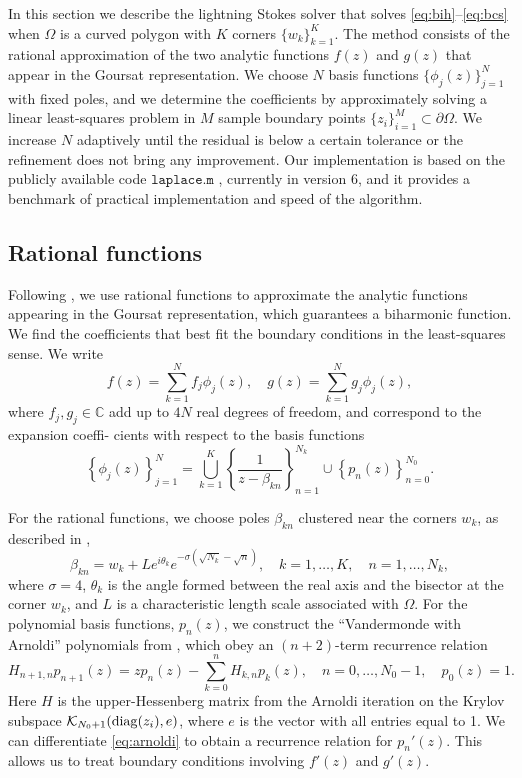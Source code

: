 \documentclass{article}
\begin{document}
In this section we describe the lightning Stokes solver that solves
\eqref{eq:bih}--\eqref{eq:bcs} when $\Omega$ is a curved polygon with $K$
corners $\{w_k\}_{k=1}^K$. The method consists of the rational approximation of
the two analytic functions $f(z)$ and $g(z)$ that appear in the Goursat
representation. We choose $N$ basis functions $\{\phi_j(z)\}_{j=1}^N$ with
fixed poles, and we determine the coefficients by approximately solving a
linear least-squares problem in $M$ sample boundary points $\{z_i\}_{i=1}^M
\subset \partial\Omega$. We increase $N$ adaptively until the residual is below
a certain tolerance or the refinement does not bring any improvement. Our
implementation is based on the publicly available code $\texttt{laplace.m}$
\cite{tref20}, currently in version 6, and it provides a benchmark of practical
implementation and speed of the algorithm.


\subsection{Rational functions}
Following \cite{gopal19}, we use rational functions to approximate the analytic
functions appearing in the Goursat representation, which guarantees a
biharmonic function. We find the coefficients that best fit the boundary
conditions in the least-squares sense. We write
\begin{equation}
f(z) = \sum_{k=1}^N f_j \phi_j(z), \quad g(z) = \sum_{k=1}^N g_j \phi_j(z),
\end{equation}
where $f_j, g_j\in \mathbb{C}$ add up to $4N$ real degrees of freedom, and
correspond to the expansion coeffi- cients with respect to the basis functions
\begin{equation}
\left\{\phi_j(z)\right\}_{j=1}^{N} = 
   \bigcup_{k=1}^K\left\{\frac{1}{z-\beta_{kn}}\right\}_{n=1}^{N_k} 
   \cup \left\{p_n(z)\right\}_{n=0}^{N_0}.
\end{equation}

For the rational functions, we choose poles $\beta_{kn}$ clustered near the
corners $w_k$, as described in \cite{gopal19},
\begin{equation}
\beta_{kn} = w_k + Le^{i\theta_k} e^{-\sigma (\sqrt{N_k}-\sqrt{n})}, 
   \quad k=1,\ldots,K,\quad n=1,\ldots,N_k,
\end{equation}
where $\sigma=4$, $\theta_k$ is the angle formed between the real axis and the
bisector at the corner $w_k$, and $L$ is a characteristic length scale
associated with $\Omega$. For the polynomial basis functions, $p_n(z)$, we
construct the ``Vandermonde with Arnoldi'' polynomials from \cite{brubeck19},
which obey an $(n+2)$-term recurrence relation
\begin{equation} \label{eq:arnoldi}
H_{n+1,n} p_{n+1}(z) = z p_n(z) - \sum_{k=0}^n H_{k,n} p_k(z),
   \quad n=0,\ldots,N_0-1, \quad p_0(z)=1.
\end{equation}
Here $H$ is the upper-Hessenberg matrix from the Arnoldi iteration on the
Krylov subspace $\mathcal{K}_{N_0+1}(\operatorname{diag}(z_i), e)$, where $e$ is the vector
with all entries equal to 1. We can differentiate \eqref{eq:arnoldi} to obtain
a recurrence relation for $p_n'(z)$. This allows us to treat boundary
conditions involving $f'(z)$ and $g'(z)$.
\end{document}
